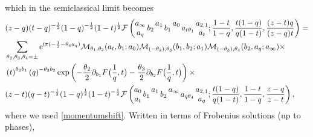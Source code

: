 \documentclass[11pt]{article}
\numberwithin{equation}{section}
\newcommand{\ri}{{\rm i}}
\newcommand{\E}{{\mathrm e}}
\begin{document}
%
which in the semiclassical limit becomes
\begin{equation}\label{connIIblock}
\begin{aligned}
&(z-q)(t-q)^{-\frac{1}{2}}(1-q)^{-\frac{1}{2}}(1-t)^{\frac{1}{2}}\mathcal{F}\left( \begin{matrix} a_{\infty} \\ a_{q} \end{matrix} \, b_2 \, \begin{matrix} a_1  \\ \, \end{matrix} \,b_1 \, \begin{matrix} a_0 \\ \, \end{matrix} \,a_{t\theta_1} \, \begin{matrix} a_{2,1} \\ a_t \end{matrix} ; \frac{1-t}{1-q}, \frac{t(1-q)}{q(1-t)}, \frac{(z-t)q}{(z-q)t} \right)=\\
&\sum_{\theta_2,\theta_3,\theta_4=\pm}\E^{\ri\pi(-\frac1 2-\theta_4 a_q)}\mathcal{M}_{\theta_1,\theta_2}(a_t,b_1;a_0)\mathcal{M}_{(-\theta_2),\theta_3}(b_1,b_2;a_1)\mathcal{M}_{(-\theta_3),\theta_4}(b_2,a_{q};a_{\infty})\times\\
&\left(t\right)^{\theta_2b_1}\left(q\right)^{-\theta_3b_2}\exp\left(-\frac{\theta_2}{2}\partial_{b_1}F\big({1\over q},t\big)-\frac{\theta_3}{2}\partial_{b_2}F\big({1\over q},t\big)\right)\times\\
&(z-t)(q-t)^{-\frac{1}{2}}(1-q)^{\frac{1}{2}}(1-t)^{-\frac{1}{2}} \mathcal{F}\left( \begin{matrix} a_{0} \\ a_{t} \end{matrix} \, b_{1} \, \begin{matrix} a_{1}  \\ \, \end{matrix} \,b_{2} \, \begin{matrix} a_{\infty} \\ \, \end{matrix} \,a_{q\theta_4} \, \begin{matrix} a_{2,1} \\ a_{q} \end{matrix} ; \frac{t(1-q)}{q(1-t)},\frac{1-t}{1-q}, \frac{z-q}{z-t}\right),
\end{aligned}
\end{equation}
%
where we used \eqref{momentumshift}. 
%
Written in terms of Frobenius solutions (up to phases), 
\end{document}

